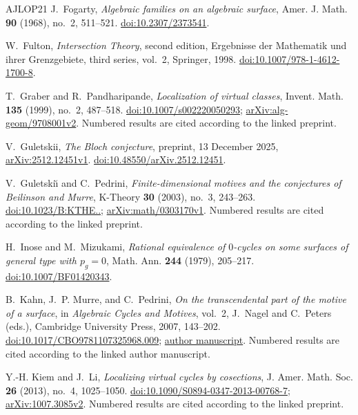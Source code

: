 \begin{thebibliography}{AJLOP21}
J.~Fogarty, \emph{Algebraic families on an algebraic surface},
Amer. J. Math. \textbf{90} (1968), no.~2, 511--521.
\href{https://doi.org/10.2307/2373541}{doi:10.2307/2373541}.

W.~Fulton, \emph{Intersection Theory}, second edition,
Ergebnisse der Mathematik und ihrer Grenzgebiete, third series, vol.~2,
Springer, 1998.
\href{https://doi.org/10.1007/978-1-4612-1700-8}{doi:10.1007/978-1-4612-1700-8}.

T.~Graber and R.~Pandharipande, \emph{Localization of virtual classes},
Invent. Math. \textbf{135} (1999), no.~2, 487--518.
\href{https://doi.org/10.1007/s002220050293}{doi:10.1007/s002220050293};
\href{https://arxiv.org/abs/alg-geom/9708001v2}{arXiv:alg-geom/9708001v2}.
Numbered results are cited according to the linked preprint.

V.~Guletskii, \emph{The Bloch conjecture}, preprint, 13 December 2025,
\href{https://arxiv.org/abs/2512.12451v1}{arXiv:2512.12451v1}.
\href{https://doi.org/10.48550/arXiv.2512.12451}{doi:10.48550/arXiv.2512.12451}.

V.~Guletski\u\i{} and C.~Pedrini,
\emph{Finite-dimensional motives and the conjectures of Beilinson and Murre},
K-Theory \textbf{30} (2003), no.~3, 243--263.
\href{https://doi.org/10.1023/B:KTHE.0000019787.69435.89}{doi:10.1023/\allowbreak B:KTHE..};
\href{https://arxiv.org/abs/math/0303170v1}{arXiv:math/0303170v1}.
Numbered results are cited according to the linked preprint.

H.~Inose and M.~Mizukami,
\emph{Rational equivalence of $0$-cycles on some surfaces of general type with $p_g=0$},
Math. Ann. \textbf{244} (1979), 205--217.
\href{https://doi.org/10.1007/BF01420343}{doi:10.1007/BF01420343}.

B.~Kahn, J.~P. Murre, and C.~Pedrini,
\emph{On the transcendental part of the motive of a surface},
in \emph{Algebraic Cycles and Motives}, vol.~2,
J.~Nagel and C.~Peters (eds.), Cambridge University Press, 2007,
143--202.
\href{https://doi.org/10.1017/CBO9781107325968.009}{doi:10.1017/CBO9781107325968.009};
\href{https://webusers.imj-prg.fr/~bruno.kahn/preprints/surfaces4.pdf}{author manuscript}.
Numbered results are cited according to the linked author manuscript.

Y.-H. Kiem and J.~Li, \emph{Localizing virtual cycles by cosections},
J. Amer. Math. Soc. \textbf{26} (2013), no.~4, 1025--1050.
\href{https://doi.org/10.1090/S0894-0347-2013-00768-7}{doi:10.1090/S0894-0347-2013-00768-7};
\href{https://arxiv.org/abs/1007.3085v2}{arXiv:1007.3085v2}.
Numbered results are cited according to the linked preprint.


\end{thebibliography}
